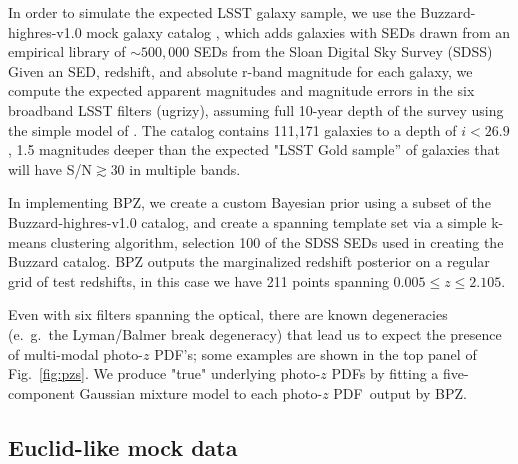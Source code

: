 \documentclass[\docopts]{\docclass}
\newcommand{\pz}{photo-$z$ PDF}
\begin{document}
In order to simulate the expected LSST galaxy sample, we use the 
Buzzard-highres-v1.0 mock galaxy catalog , which 
adds galaxies with SEDs drawn from an empirical library of $\sim500,000$ SEDs 
from the Sloan Digital Sky Survey  (SDSS)     Given an SED, redshift, and absolute r-band 
magnitude for each galaxy, we compute the expected apparent magnitudes and 
magnitude errors in the six broadband LSST filters (ugrizy), assuming full 
10-year depth of the survey using the simple model of 
\citet{ivezic_lsst:_2008}.  The catalog contains 111,171 galaxies to a depth of 
$i<26.9$, 1.5 magnitudes deeper than the expected "LSST Gold sample'' of 
galaxies that will have S/N$\gtrsim$30 in multiple bands.

In implementing BPZ, we create a custom Bayesian prior using a subset of the 
Buzzard-highres-v1.0 catalog, and create a spanning template set via a simple 
k-means clustering algorithm, selection 100 of the SDSS SEDs used in creating 
the Buzzard catalog.  BPZ outputs the marginalized redshift posterior on a 
regular grid of test redshifts, in this case we have 211 points spanning 
$0.005\leq z\leq2.105$.

Even with six filters spanning the optical, there are known degeneracies 
(e.~g.~the Lyman/Balmer break degeneracy) that lead us to expect the presence 
of multi-modal \pz's; some examples are shown in the top panel of 
Fig.~\ref{fig:pzs}.  We produce "true" underlying \pz s by fitting a 
five-component Gaussian mixture model to each \pz\ output by BPZ.


\subsection{Euclid-like mock data}
\label{sec:Euclid}

\end{document}
